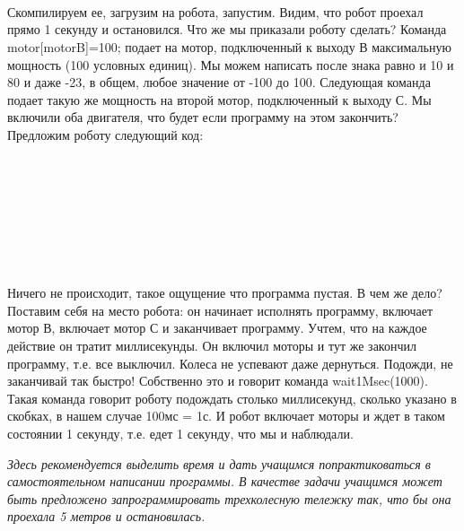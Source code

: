 {\programm
	{\slshape{}}\rC{()}\\
	\rC{\{}\\
	\indent {}\\
	\indent {}\\
	\indent {}\\
	\rC{\}}\\
}\\\\

Скомпилируем ее, загрузим на робота, запустим. Видим, что робот проехал прямо 1 секунду и остановился. Что же мы приказали роботу сделать? Команда motor[motorB]=100; подает на мотор, подключенный к выходу В максимальную мощность (100 условных единиц). Мы можем написать после знака равно и 10 и 80 и даже -23, в общем, любое значение от -100 до 100.  Следующая команда подает такую же мощность на второй мотор, подключенный к выходу С. Мы включили оба двигателя, что будет если программу на этом закончить? Предложим роботу следующий код:\\\\

{\programm
	{\slshape{}}\rC{()}\\
	\rC{\{}\\
	\indent {}\\
	\indent {}\\
	\rC{\}}\\
}\\\\

Ничего не происходит, такое  ощущение что программа пустая. В чем же дело? Поставим себя на место робота: он начинает исполнять программу, включает мотор В, включает мотор С и заканчивает программу. Учтем, что на каждое действие он тратит миллисекунды. Он включил моторы и тут же закончил программу, т.е. все выключил. Колеса не успевают даже дернуться. Подожди, не заканчивай так быстро! Собственно это и говорит команда wait1Msec(1000). Такая команда говорит роботу подождать столько миллисекунд, сколько указано в скобках, в нашем случае 100мс = 1с. И робот включает моторы и ждет в таком состоянии 1 секунду, т.е. едет 1 секунду, что мы и наблюдали.

{\slshape Здесь рекомендуется выделить время и дать учащимся попрактиковаться в самостоятельном написании программы. В качестве задачи учащимся может быть предложено запрограммировать трехколесную тележку так, что бы она проехала 5 метров и остановилась.}

